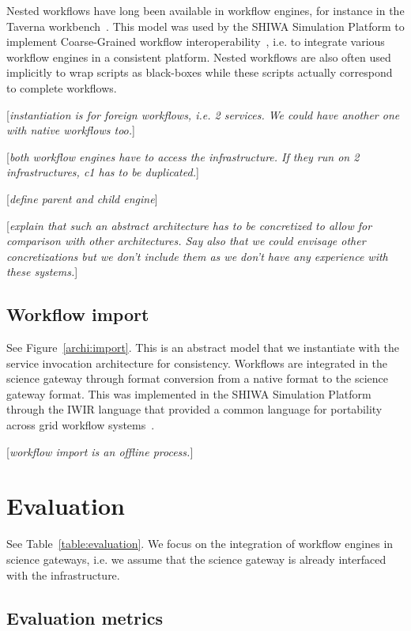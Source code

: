\documentclass[preprint,3p,twocolumn]{elsarticle}
\newcommand{\todo}[1]{\color{blue}\xspace[\emph{#1}]\xspace\color{black}}
\begin{document}
Nested workflows have long been available in workflow engines, for
instance in the Taverna workbench~\cite{oinn2004taverna}. This model
was used by the SHIWA Simulation Platform to implement Coarse-Grained
workflow interoperability~\cite{terstyanszky2014enabling}, i.e. to
integrate various workflow engines in a consistent platform. Nested
workflows are also often used implicitly to wrap scripts as
black-boxes while these scripts actually correspond to complete workflows.

\todo{instantiation is for foreign workflows, i.e. 2 services. We could have another one with native workflows too.}

\todo{both workflow engines have to access the infrastructure. If they
  run on 2 infrastructures, c1 has to be duplicated.}

\todo{define parent and child engine}

\todo{explain that such an abstract architecture has to be concretized to allow for comparison with other architectures. Say also that we could envisage other concretizations but we don't include them as we don't have any experience with these systems.} 

\subsection{Workflow import}

See Figure~\ref{archi:import}. This is an abstract model that we
instantiate with the service invocation architecture for
consistency. Workflows are integrated in the science gateway through
format conversion from a native format to the science gateway
format. This was implemented in the SHIWA Simulation Platform through
the IWIR language that provided a common language for portability
across grid workflow
systems~\cite{plankensteiner-prodan-etal:2013}.

\todo{workflow import is an offline process.}

\section{Evaluation}

See Table~\ref{table:evaluation}. We focus on the integration of
workflow engines in science gateways, i.e. we assume that the science
gateway is already interfaced with the infrastructure.

\subsection{Evaluation metrics}
\end{document}
